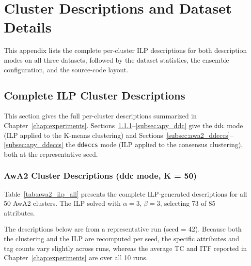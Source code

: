 \chapter{Cluster Descriptions and Dataset Details}
\label{app:descriptions}

This appendix lists the complete per-cluster ILP descriptions for both description modes on all three datasets, followed by the dataset statistics, the ensemble configuration, and the source-code layout.

\section{Complete ILP Cluster Descriptions}

This section gives the full per-cluster descriptions summarized in Chapter~\ref{chap:experiments}. Sections~\ref{subsec:awa2_ddc}--\ref{subsec:apy_ddc} give the \texttt{ddc} mode (ILP applied to the K-means clustering) and Sections~\ref{subsec:awa2_ddeccs}--\ref{subsec:apy_ddeccs} the \texttt{ddeccs} mode (ILP applied to the consensus clustering), both at the representative seed.

\subsection{AwA2 Cluster Descriptions (ddc mode, K = 50)}
\label{subsec:awa2_ddc}

Table~\ref{tab:awa2_ilp_all} presents the complete ILP-generated descriptions for all 50 AwA2 clusters. The ILP solved with $\alpha = 3$, $\beta = 3$, selecting 73 of 85 attributes.

The descriptions below are from a representative run (seed = 42). Because both the clustering and the ILP are recomputed per seed, the specific attributes and tag counts vary slightly across runs, whereas the average TC and ITF reported in Chapter~\ref{chap:experiments} are over all 10 runs.

